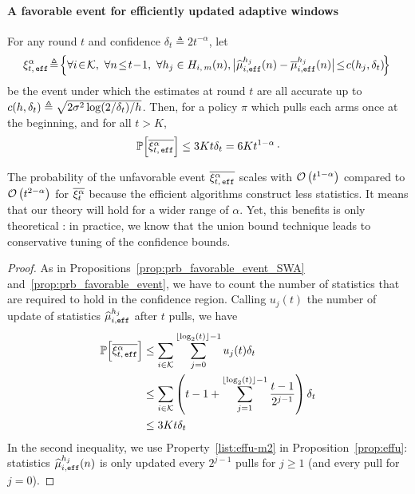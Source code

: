 \paragraph{A favorable event for efficiently updated adaptive windows}
\begin{proposition}
\label{prop:prb_favorable_event_eff}
For any round $t$ and confidence $\delta_{t} \triangleq 2t^{-\alpha}$, let 
%
\begin{equation*}
\!\HPeff\! \triangleq\! \Big\{ \forall i\!\in\!\arms,\ \forall n \!\leq\! t\!-\!1 ,\ \forall h_j \in \Him(n), \big| \hmueff(n) - \bmueff(n) \big| \!\leq\! c(h_j, \delta_{t}) \!\Big\}
\end{equation*}
 be the event under which the estimates at round $t$  are all accurate up to $c(h,\delta_{t}) \triangleq \sqrt{2 \sigma^2\log(2/\delta_t)/h}$. Then, for a policy $\pi$ which pulls each arms once at the beginning, and for all $t>K$,
\[
\mathbb{P}\Big[\overline{\xi^\alpha_{t,\, \texttt{eff}}}\Big] \leq 3Kt\delta_t= 6Kt^{1-\alpha}\,\cdot
\]
\end{proposition} 
\begin{remark}
The probability of the unfavorable event $\overline{\xi^\alpha_{t,\, \texttt{eff}}}$ scales with $\mathcal{O}\left(t^{1-\alpha}\right)$ compared to $\mathcal{O}\left(t^{2-\alpha}\right)$ for $\overline{\xi^\alpha_t}$ because the efficient algorithms construct less statistics. It means that our theory will hold for a wider range of $\alpha$. Yet, this benefits is only theoretical : in practice, we know that the union bound technique leads to conservative tuning of the confidence bounds. 
\end{remark}

\begin{proof}
As in Propositions~\ref{prop:prb_favorable_event_SWA} and~\ref{prop:prb_favorable_event}, we have to count the number of statistics that are required to hold in the confidence region. Calling $u_j(t)$ the number of update of statistics $\widehat{\mu}_{i,\texttt{eff}}^{h_j}$ after $t$ pulls, we have
\begin{align*}
    \mathbb{P}\Big[\overline{\xi^\alpha_{t,\, \texttt{eff}}}\Big] &\leq \sum_{i \in \mathcal{K}} \sum_{j=0}^{\left\lfloor\log_2\left(t\right)\right\rfloor-1} u_j(t) \delta_t \\
    &\leq \sum_{i \in \mathcal{K}} \left(t - 1  + \sum_{j=1}^{\left\lfloor\log_2\left(t\right)\right\rfloor-1} \frac{t-1}{2^{j-1}}\right) \delta_t \\
    &\leq 3Kt\delta_t
\end{align*}
In the second inequality, we use Property~\ref{list:effu-m2} in Proposition~\ref{prop:effu}: statistics $\widehat{\mu}_{i,\texttt{eff}}^{h_j}(n)$ is only updated every $2^{j-1}$ pulls for $j\geq 1$ (and every pull for $j=0$).
\end{proof}

